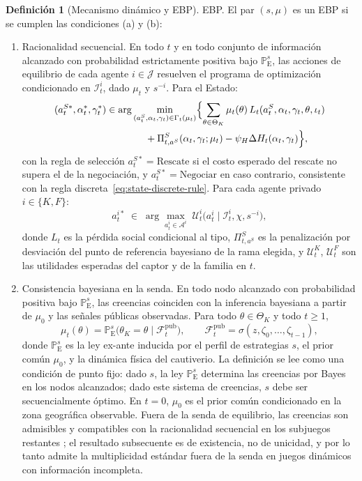 \documentclass[review,authoryear,12pt]{elsarticle}
\providecommand{\textcite}{\citet}
\theoremstyle{plain}
\theoremstyle{definition}
\newtheorem{definition}[theorem]{Definición}
\newcommand{\ProbE}{\mathbb{P}_{\mathrm{E}}}
\newcommand{\ThetaK}{\Theta_K}
\newcommand{\1}{\mathbf{1}}
\begin{document}
\begin{definition}[Mecanismo dinámico y EBP]
\smallskip
\noindent EBP. El par $(s,\mu)$ es un EBP si se cumplen las condiciones \textup{(a)} y \textup{(b)}:
\begin{enumerate}
  \item[\textup{(a)}] Racionalidad secuencial. En todo $t$ y en todo conjunto de información alcanzado con probabilidad estrictamente positiva bajo $\ProbE^s$, las acciones de equilibrio de cada agente $i\in\mathcal{J}$ resuelven el programa de optimización condicionado en $\mathcal{I}_t^i$, dado $\mu_t$ y $s^{-i}$. Para el Estado:
  \[
  \begin{aligned}
  (a_t^{S\ast},\alpha_t^\ast,\gamma_t^\ast)
  &\in
  \arg\min_{(a_t^S,\alpha_t,\gamma_t)\in\Gamma_t(\mu_t)}
  \Bigl\{
  \sum_{\theta\in\ThetaK}\mu_t(\theta)\,L_t(a_t^S,\alpha_t,\gamma_t,\theta,\iota_t)\\
  &\qquad\qquad
  +\Pi_{t,a^S}^S(\alpha_t,\gamma_t;\mu_t)-\psi_H\Delta H_t(\alpha_t,\gamma_t)
  \Bigr\},
  \end{aligned}
  \]
  con la regla de selección $a_t^{S\ast}=\text{Rescate}$ si el costo esperado del rescate no supera el de la negociación, y $a_t^{S\ast}=\text{Negociar}$ en caso contrario, consistente con la regla discreta~\eqref{eq:state-discrete-rule}. Para cada agente privado $i\in\{K,F\}$:
  \[
  a_t^{i\ast}\;\in\;
  \arg\max_{a_t^i\in\mathcal{A}^i}
  \;\mathcal{U}^i_t\!\bigl(a_t^i\mid \mathcal{I}_t^i,\chi,s^{-i}\bigr),
  \]
  donde $L_t$ es la pérdida social condicional al tipo, $\Pi_{t,a^S}^S$ es la penalización por desviación del punto de referencia bayesiano de la rama elegida, y $\mathcal{U}^K_t$, $\mathcal{U}^F_t$ son las utilidades esperadas del captor y de la familia en $t$.

  \item[\textup{(b)}] Consistencia bayesiana en la senda. En todo nodo alcanzado con probabilidad positiva bajo $\ProbE^s$, las creencias coinciden con la inferencia bayesiana a partir de $\mu_0$ y las señales públicas observadas. Para todo $\theta\in\ThetaK$ y todo $t\ge 1$,
  \begin{equation}
  \label{eq:def712-bayes-mu}
  \mu_t(\theta)=\ProbE^s\!\bigl(\theta_K=\theta\mid \mathcal{F}_t^{\mathrm{pub}}\bigr),
  \qquad
  \mathcal{F}_t^{\mathrm{pub}}=\sigma(z,\zeta_0,\ldots,\zeta_{t-1}),
  \end{equation}
  donde $\ProbE^s$ es la ley ex-ante inducida por el perfil de estrategias $s$, el prior común $\mu_0$, y la dinámica física del cautiverio. La definición se lee como una condición de punto fijo: dado $s$, la ley $\ProbE^s$ determina las creencias por Bayes en los nodos alcanzados; dado este sistema de creencias, $s$ debe ser secuencialmente óptimo. En $t=0$, $\mu_0$ es el prior común condicionado en la zona geográfica observable. Fuera de la senda de equilibrio, las creencias son admisibles y compatibles con la racionalidad secuencial en los subjuegos restantes \textcite{FudenbergTirole1991,KrepsWilson1982}; el resultado subsecuente es de existencia, no de unicidad, y por lo tanto admite la multiplicidad estándar fuera de la senda en juegos dinámicos con información incompleta.
\end{enumerate}
\end{definition}
\end{document}
